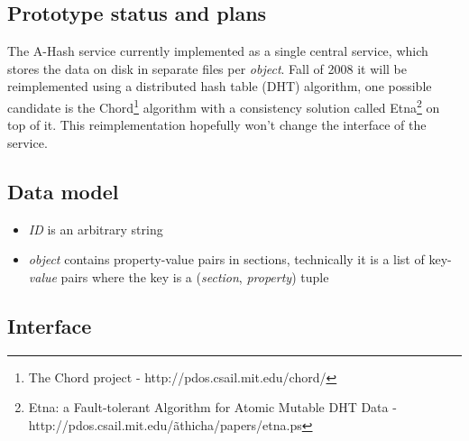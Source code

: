 \documentclass{book}
\begin{document}

\subsection{Prototype status and plans} %

The A-Hash service currently implemented as a single central service, which stores the data on disk in separate files per \emph{object}. Fall of 2008 it will be reimplemented using a distributed hash table (DHT) algorithm, one possible candidate is the Chord\footnote{The Chord project - http://pdos.csail.mit.edu/chord/} algorithm with a consistency solution called Etna\footnote{Etna: a Fault-tolerant Algorithm for Atomic Mutable DHT Data - http://pdos.csail.mit.edu/\~athicha/papers/etna.ps} on top of it. This reimplementation hopefully won’t change the interface of the service.


\subsection{Data model} %

\begin{itemize}
    \item \emph{ID} is an arbitrary string
    \item \emph{object} contains property-value pairs in sections, technically it is a list of key-\emph{value} pairs where the key is a (\emph{section}, \emph{property}) tuple
\end{itemize}


\subsection{Interface} %
\end{document}
